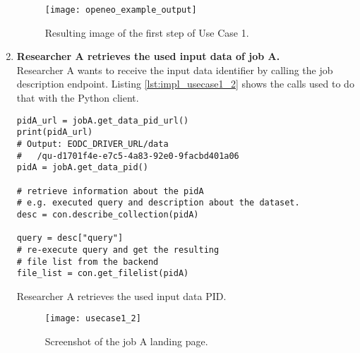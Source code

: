 \documentclass[draft,final]{vutinfth} %
\newenvironment{code}{\captionsetup{type=listing}}{}
\begin{document}
\begin{enumerate}
\begin{figure}[h]
	\centering
	\texttt{[image: openeo\_example\_output]}
	\caption{Resulting image of the first step of Use Case 1.}
	\label{fig:impl_usecase1_min} %
\end{figure}

	\item \textbf{Researcher A retrieves the used input data of job A.} \\
	Researcher A wants to receive the input data identifier by calling the job description endpoint. Listing \ref{lst:impl_usecase1_2} shows the calls used to do that with the Python client.

\begin{code}
	\begin{verbatim}
pidA_url = jobA.get_data_pid_url()
print(pidA_url)
# Output: EODC_DRIVER_URL/data
#	/qu-d1701f4e-e7c5-4a83-92e0-9facbd401a06
pidA = jobA.get_data_pid()

# retrieve information about the pidA 
# e.g. executed query and description about the dataset.
desc = con.describe_collection(pidA)

query = desc["query"]
# re-execute query and get the resulting 
# file list from the backend
file_list = con.get_filelist(pidA)
	\end{verbatim}
	\caption{Researcher A retrieves the used input data PID.}
	\label{lst:impl_usecase1_2}
\end{code}
	
	\begin{figure}[h]
		\centering
		\texttt{[image: usecase1\_2]}
		\caption{Screenshot of the job A landing page.}
		\label{fig:usecase1-pid} %
	\end{figure}
	

\end{enumerate}
\end{document}
